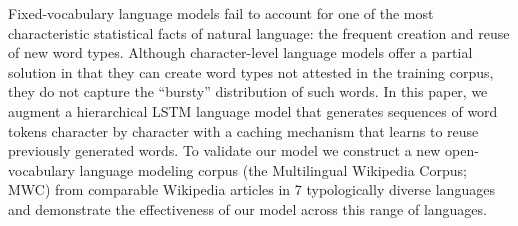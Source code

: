 Fixed-vocabulary language models fail to account for one of the most characteristic statistical facts of natural language: the frequent creation and reuse of new word types. Although character-level language models offer a partial solution in that they can create word types not attested in the training corpus, they do not capture the ``bursty'' distribution of such words. In this paper, we augment a hierarchical LSTM language model that generates sequences of word tokens character by character with a caching mechanism that learns to reuse previously generated words. To validate our model we construct a new open-vocabulary language modeling corpus (the Multilingual Wikipedia Corpus; MWC) from comparable Wikipedia articles in 7 typologically diverse languages and demonstrate the effectiveness of our model across this range of languages.
